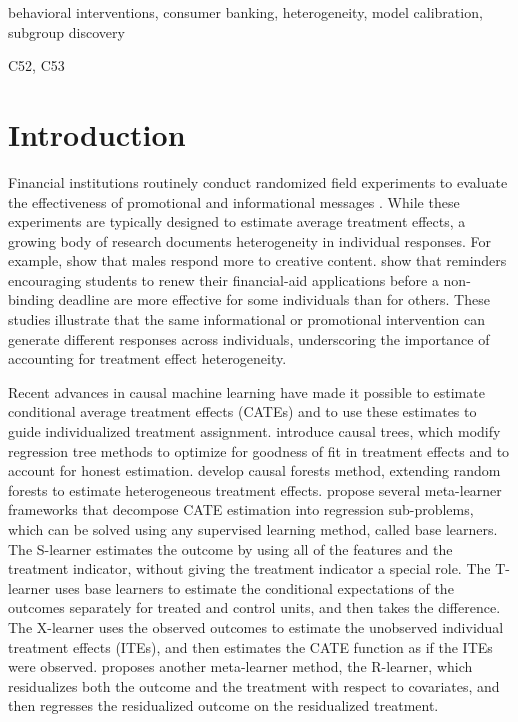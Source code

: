 \documentclass[12pt]{article}
\begin{document}
 behavioral interventions, consumer banking, heterogeneity, model calibration, subgroup discovery

 C52, C53

\newpage
{}

\section{Introduction}

Financial institutions routinely conduct randomized field experiments to evaluate the effectiveness of promotional and informational messages \citep[e.g.][]{bertrand2010,karlan2016getting,alan2018}. While these experiments are typically designed to estimate average treatment effects, a growing body of research documents heterogeneity in individual responses. For example, \cite{bertrand2010} show that males respond more to creative content. \cite{athey2025} show that reminders encouraging students to renew their financial-aid applications before a non-binding deadline are more effective for some individuals than for others. These studies illustrate that the same informational or promotional intervention can generate different responses across individuals, underscoring the importance of accounting for treatment effect heterogeneity.

Recent advances in causal machine learning have made it possible to estimate conditional average treatment effects (CATEs) and to use these estimates to guide individualized treatment assignment. \cite{athey2016} introduce causal trees, which modify regression tree methods to optimize for goodness of fit in treatment effects and to account for honest estimation. \cite{wager2018} develop causal forests method, extending random forests to estimate heterogeneous treatment effects. \cite{kunzel2019} propose several meta-learner frameworks that decompose CATE estimation into regression sub-problems, which can be solved using any supervised learning method, called base learners. The S-learner estimates the outcome by using all of the features and the treatment indicator, without giving the treatment indicator a special role. The T-learner uses base learners to estimate the conditional expectations of the outcomes separately for treated and control units, and then takes the difference. The X-learner uses the observed outcomes to estimate the unobserved individual treatment effects (ITEs), and then estimates the CATE function as if the ITEs were observed. \cite{nie2021} proposes another meta-learner method, the R-learner, which residualizes both the outcome and the treatment with respect to covariates, and then regresses the residualized outcome on the residualized treatment.
\end{document}

